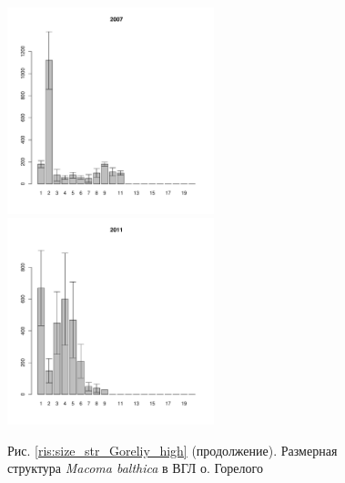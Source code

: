 \begin{figure}[h]

\begin{multicols}{3}
\hfill
\includegraphics[width=60mm]{../White_Sea/Luvenga_Goreliy/high_2007_.pdf}
\hfill
\includegraphics[width=60mm]{../White_Sea/Luvenga_Goreliy/high_2011_.pdf}
\end{multicols}


\begin{center}
Рис. \ref{ris:size_str_Goreliy_high} (продолжение). Размерная структура {\it Macoma balthica} в ВГЛ о. Горелого

\end{center}
\end{figure}

